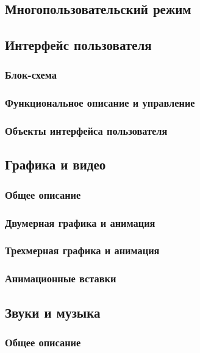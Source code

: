 \documentclass{article}
\begin{document}
\subsection{Многопользовательский режим}


\subsection{Интерфейс пользователя}
\subsubsection{Блок-схема}


\subsubsection{Функциональное описание и управление}


\subsubsection{Объекты интерфейса пользователя}


\subsection{Графика и видео}
\subsubsection{Общее описание}


\subsubsection{Двумерная графика и анимация}


\subsubsection{Трехмерная графика и анимация}


\subsubsection{Анимационные вставки}


\subsection{Звуки и музыка}
\subsubsection{Общее описание}
\end{document}
